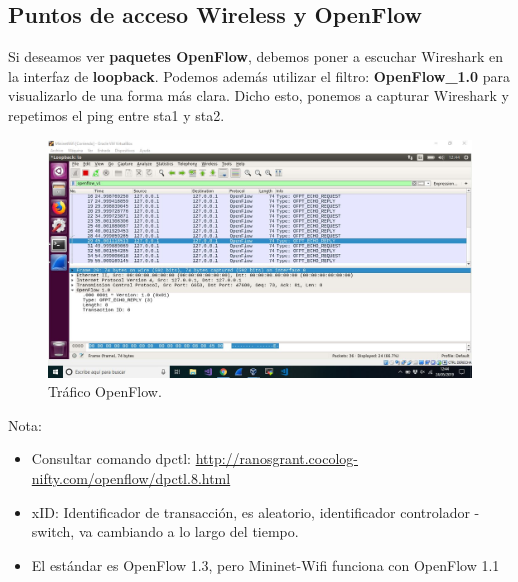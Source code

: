 \subsection{Puntos de acceso Wireless y OpenFlow}
Si deseamos ver \textbf{paquetes OpenFlow}, debemos poner a escuchar Wireshark  en la interfaz de \textbf{loopback}. Podemos además utilizar el filtro: \textbf{OpenFlow\_1.0} para visualizarlo de una forma más clara. Dicho esto, ponemos a capturar Wireshark y repetimos el ping entre sta1 y sta2.
\begin{figure}[!htb]
  \centering
    \includegraphics[width=\linewidth]{./img/test/7.JPG}
    \caption{Tráfico OpenFlow.}
  \label{fig:yo}
\end{figure}
\newline
Nota: 
\begin{itemize}
    \item Consultar comando dpctl: \url{http://ranosgrant.cocolog-nifty.com/openflow/dpctl.8.html}
    \item xID: Identificador de transacción, es aleatorio, identificador controlador - switch, va cambiando a lo largo del tiempo.  
    \item El estándar es OpenFlow 1.3, pero Mininet-Wifi funciona con OpenFlow 1.1
\end{itemize}

